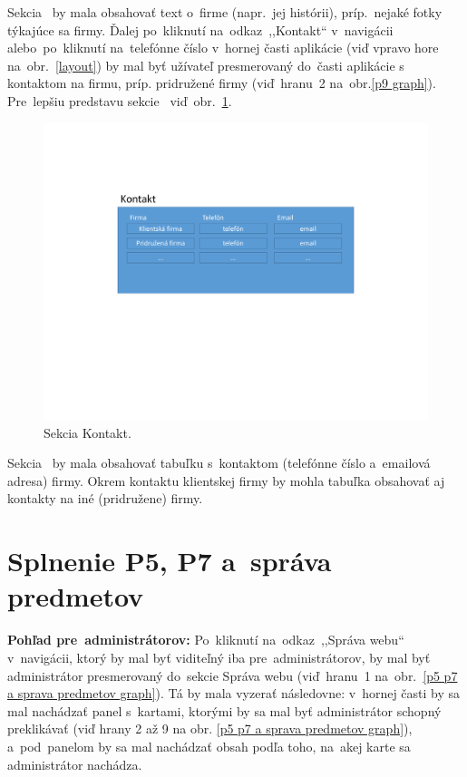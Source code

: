 Sekcia~ by mala obsahovať text o~firme (napr.~jej histórii), príp.~nejaké fotky týkajúce sa firmy. Ďalej po~kliknutí na~odkaz~,,Kontakt`` v~navigácii alebo~po~kliknutí na~telefónne číslo v~hornej časti aplikácie (viď vpravo hore na~obr.~\ref{layout}) by mal byť užívateľ presmerovaný do~časti aplikácie s kontaktom na firmu, príp. pridružené firmy (viď~hranu~2 na~obr.\ref{p9 graph}). Pre~lepšiu predstavu sekcie~ viď~obr.~\ref{contact}.

\begin{figure}[H]\centering
\includegraphics[width=140mm]{../img/UI concept/contact}
\caption{Sekcia Kontakt.}
\label{contact}
\end{figure}

Sekcia~ by mala obsahovať tabuľku s~kontaktom (telefónne číslo a~emailová adresa) firmy. Okrem kontaktu klientskej firmy by mohla tabuľka obsahovať aj kontakty na iné (pridružene) firmy.

\section{Splnenie P5, P7 a~správa predmetov}
\label{splnenie p5 p7 a sprava predmetov}

\textbf{Pohľad pre~administrátorov:} Po~kliknutí na~odkaz~,,Správa webu`` v~navigácii, ktorý by mal byť viditeľný iba pre~administrátorov, by mal byť administrátor presmerovaný do~sekcie Správa webu (viď~hranu~1 na~obr.~\ref{p5 p7 a sprava predmetov graph}). Tá by mala vyzerať následovne: v~hornej časti by sa mal nachádzať panel s~kartami, ktorými by sa mal byť administrátor schopný preklikávať (viď hrany 2 až 9 na obr. \ref{p5 p7 a sprava predmetov graph}), a~pod~panelom by sa mal nachádzať obsah podľa toho, na~akej karte sa administrátor nachádza.

